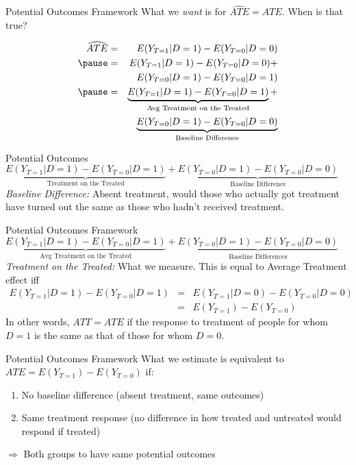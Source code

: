 \documentclass[11pt]{beamer}
\begin{document}
\begin{frame}[c]{Potential Outcomes Framework}
What we \emph{want} is for $\widehat{ATE} = ATE$. When is that true?

  \begin{eqnarray}
  \widehat{ATE} &=&E(Y_{T=1}|D=1) - E(Y_{T=0}|D=0) \nonumber \\
                \pause &=&E(Y_{T=1}|D=1) - E(Y_{T=0}|D=0) + \nonumber \\
                &&E(Y_{T=0}|D=1) - E(Y_{T=0}|D=1)  \nonumber \\
               \pause &=& \underbrace{E(Y_{T=1}|D=1) - E(Y_{T=0}|D=1)}_{\text{Avg Treatment on the Treated}} + \nonumber \\ &&\underbrace{E(Y_{T=0}|D=1) - E(Y_{T=0}|D=0)}_{\text{Baseline Difference}} \nonumber
  \end{eqnarray}
\end{frame}

\begin{frame}[c]{Potential Outcomes}
$\underbrace{E(Y_{T=1}|D=1) - E(Y_{T=0}|D=1)}_{\text{Treatment on the Treated}} + \underbrace{E(Y_{T=0}|D=1) - E(Y_{T=0}|D=0)}_{\text{Baseline Difference}}$ \\
\vspace*{1cm}
\emph{Baseline Difference:} Absent treatment, would those who actually got treatment have turned out the same as those who hadn't received treatment.
\end{frame}

\begin{frame}[c]{Potential Outcomes Framework}
$\underbrace{E(Y_{T=1}|D=1) - E(Y_{T=0}|D=1)}_{\text{Avg Treatment on the Treated}} + \underbrace{E(Y_{T=0}|D=1) - E(Y_{T=0}|D=0)}_{\text{Baseline Differences}}$ \\
\vspace*{1cm}
\emph{Treatment on the Treated:} What we measure. This is equal to Average Treatment effect iff
\begin{eqnarray}
E(Y_{T=1}|D=1) - E(Y_{T=0}|D=1) &=& E(Y_{T=1}|D=0) - E(Y_{T=0}|D=0)\nonumber \\
                                &=& E(Y_{T=1}) - E(Y_{T=0})\nonumber
\end{eqnarray}
In other words, $ATT = ATE$ if the response to treatment of people for whom $D=1$ is the same as that of those for whom $D=0$.
\end{frame}

\begin{frame}[c]{Potential Outcomes Framework}
What we estimate is equivalent to $ATE = E(Y_{T=1}) - E(Y_{T=0})$ if:

\begin{enumerate}
  \item No baseline difference (absent treatment, same outcomes)
  \item Same treatment response (no difference in how treated and untreated would respond if treated)
\end{enumerate}
$\Rightarrow$ Both groups to have \alert{same potential outcomes}
\end{frame}
\end{document}

